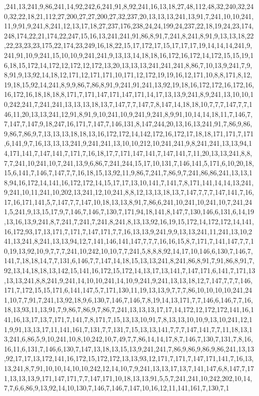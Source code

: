 ,241,13,241,9,86,241,14,92,242,6,241,91,8,92,241,16,13,18,27,48,112,48,32,240,32,240,32,22,18,21,112,27,200,27,27,200,27,32,237,20,13,13,13,241,13,91,7,241,10,10,241,11,9,91,9,241,8,241,12,13,17,18,27,237,176,238,24,24,199,24,237,22,18,19,24,23,174,248,174,22,21,174,22,247,15,16,13,241,241,91,86,8,91,7,241,8,241,8,91,9,13,13,18,22,22,23,23,23,175,22,174,23,249,16,18,22,15,17,172,17,15,17,17,17,19,14,14,14,241,9,241,91,10,9,241,15,10,10,9,241,241,9,13,13,14,18,18,16,172,16,172,14,172,15,15,19,16,18,15,172,14,172,12,172,12,172,13,20,13,13,13,241,241,241,8,86,7,10,13,9,241,7,9,8,91,9,13,92,14,18,12,171,12,171,171,10,171,12,172,19,19,16,12,171,10,8,8,171,8,12,19,18,15,92,14,241,8,9,9,86,7,86,8,91,9,241,91,241,13,92,19,18,16,172,172,16,172,16,16,172,16,18,18,18,8,171,7,171,147,171,147,171,14,17,13,13,9,241,8,9,241,13,10,10,10,242,241,7,241,241,13,13,13,18,13,7,147,7,7,147,7,8,147,14,18,18,10,7,7,7,147,7,7,146,11,20,13,13,241,12,91,8,91,9,10,241,10,9,241,9,241,8,9,91,10,14,14,18,11,7,146,7,7,147,7,147,9,18,247,16,171,7,147,7,146,131,8,147,244,20,13,16,13,241,91,7,86,9,86,9,86,7,86,9,7,13,13,13,18,18,13,16,172,172,14,142,172,16,172,17,18,18,171,171,7,171,6,141,9,7,16,13,13,13,241,9,241,241,13,10,10,212,10,241,241,9,8,241,241,13,13,94,14,171,141,7,147,141,7,171,7,16,18,17,7,171,147,141,7,147,141,7,11,20,13,13,241,8,8,7,7,241,10,241,10,7,241,13,9,6,86,7,241,244,15,17,10,131,7,146,141,5,171,6,10,20,18,15,6,141,7,146,7,147,7,7,16,18,15,13,92,11,9,86,7,241,7,86,9,7,241,86,86,241,13,13,18,94,16,172,14,141,16,172,172,14,15,17,17,13,10,141,7,141,7,8,171,141,14,14,13,241,9,241,10,11,241,10,202,13,241,12,10,241,8,8,12,13,13,18,13,7,147,7,7,7,147,141,7,16,17,16,171,141,5,7,147,7,7,147,10,18,13,13,8,91,7,86,6,241,10,241,10,241,10,7,241,241,5,241,9,13,15,17,9,7,146,7,146,7,130,7,171,94,18,141,8,147,7,130,146,6,131,6,14,19,13,16,13,9,241,8,7,241,7,241,7,241,8,241,8,13,13,92,16,19,15,172,14,172,172,14,141,16,172,93,17,13,171,7,171,7,147,171,7,7,16,13,13,9,241,9,9,13,13,241,11,241,13,10,241,13,241,8,241,13,13,94,12,7,141,146,141,147,7,7,7,16,16,15,8,7,171,7,141,147,7,7,10,19,13,92,10,9,7,7,7,241,10,242,10,10,7,7,241,5,8,8,8,92,14,17,10,146,6,130,7,146,7,141,7,18,18,14,7,7,131,6,146,7,7,147,14,18,15,13,13,241,8,241,86,8,91,7,91,86,8,91,7,92,13,14,18,18,13,142,15,141,16,172,15,172,14,13,17,13,141,7,147,171,6,141,7,171,13,13,13,241,8,8,241,9,241,14,10,10,241,14,10,9,241,9,241,13,13,18,12,7,147,7,7,7,146,171,7,172,15,15,171,6,141,147,5,7,171,130,11,19,13,13,9,7,7,7,86,10,10,10,10,241,241,10,7,7,91,7,241,13,92,18,9,6,130,7,146,7,146,7,8,19,14,13,171,7,7,146,6,146,7,7,16,18,13,93,11,13,91,7,9,86,7,86,9,7,86,7,241,13,13,13,17,17,14,172,12,172,172,141,16,141,16,13,17,13,7,171,7,141,7,8,171,7,15,13,13,10,91,7,8,13,13,10,10,9,13,10,241,12,11,9,91,13,13,17,11,141,161,7,131,7,7,131,7,15,13,13,141,7,7,7,147,141,7,7,11,18,13,13,241,6,86,5,9,10,241,10,8,10,242,10,7,49,7,7,86,14,14,17,8,7,146,7,130,7,131,7,8,16,16,11,6,131,7,146,6,130,7,147,13,18,13,15,13,9,241,241,7,86,9,86,9,86,9,86,241,13,13,92,17,17,13,172,141,16,172,15,172,172,13,13,93,12,171,7,171,7,147,171,141,7,16,13,13,241,8,7,91,10,10,14,10,10,242,12,14,10,7,9,241,13,13,17,13,7,141,147,6,8,147,7,171,13,13,13,9,171,147,171,7,7,147,171,10,18,13,13,91,5,5,7,241,241,10,242,202,10,14,7,7,6,6,86,9,13,92,14,10,130,7,146,7,146,7,147,10,16,12,11,141,161,7,130,7,1